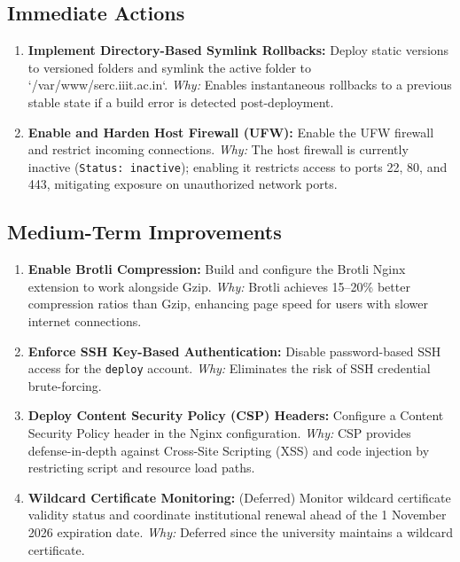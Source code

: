 \documentclass[11pt,a4paper,DIV=16,headings=normal,parskip=half]{scrartcl}
\begin{document}
\subsection{Immediate Actions}

\begin{enumerate}
\item \textbf{Implement Directory-Based Symlink Rollbacks:} Deploy static versions to versioned folders and symlink the active folder to `/var/www/serc.iiit.ac.in`.
\textit{Why:} Enables instantaneous rollbacks to a previous stable state if a build error is detected post-deployment.
\item \textbf{Enable and Harden Host Firewall (UFW):} Enable the UFW firewall and restrict incoming connections.
\textit{Why:} The host firewall is currently inactive (\texttt{Status: inactive}); enabling it restricts access to ports 22, 80, and 443, mitigating exposure on unauthorized network ports.
\end{enumerate}

\subsection{Medium-Term Improvements}

\begin{enumerate}
\item \textbf{Enable Brotli Compression:} Build and configure the Brotli Nginx extension to work alongside Gzip.
\textit{Why:} Brotli achieves 15--20\% better compression ratios than Gzip, enhancing page speed for users with slower internet connections.
\item \textbf{Enforce SSH Key-Based Authentication:} Disable password-based SSH access for the \texttt{deploy} account.
\textit{Why:} Eliminates the risk of SSH credential brute-forcing.
\item \textbf{Deploy Content Security Policy (CSP) Headers:} Configure a Content Security Policy header \cite{rfc7762} in the Nginx configuration.
\textit{Why:} CSP provides defense-in-depth against Cross-Site Scripting (XSS) and code injection by restricting script and resource load paths.
\item \textbf{Wildcard Certificate Monitoring:} (Deferred) Monitor wildcard certificate validity status and coordinate institutional renewal ahead of the 1 November 2026 expiration date.
\textit{Why:} Deferred since the university maintains a wildcard certificate.
\end{enumerate}
\end{document}
